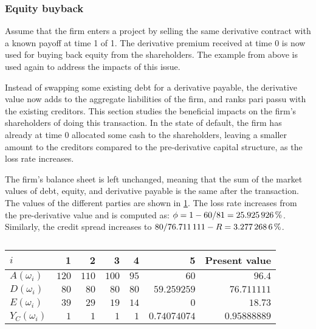 \documentclass[main.tex]{subfiles}
\begin{document}
        \subsubsection{Equity buyback}
            Assume that the firm enters a project 
            by selling the same derivative contract with a known payoff at time 1 of 1. 
            The derivative premium received at time 0 is now used for buying back equity from the shareholders. 
            The example from above is used again to address the impacts of this issue.

            Instead of swapping some existing debt for a derivative payable, 
            the derivative value now adds to the aggregate liabilities of the firm, 
            and ranks pari passu with the existing creditors.
            This section studies the beneficial impacts on the firm's shareholders of doing this transaction.
            In the state of default, the firm has already at time 0 allocated some cash to the shareholders, 
            leaving a smaller amount to the creditors compared to the pre-derivative capital structure, 
            as the loss rate increases.

            The firm's balance sheet is left unchanged, meaning that the sum of the market values of debt, equity, 
            and derivative payable is the same after the transaction. 
            The values of the different parties are shown in \cref{tbl:example-equity-buyback}. 
            The loss rate increases from the pre-derivative value and is computed as:
            $\phi = 1 - \num{60}/\num{81} = \pct{0.25925926}$.
            Similarly, the credit spread increases to
            $\num{80}/\num{76.711111} - \grossrfrate = \pct{0.032772686}$.
            \begin{table}[H]
                \centering
                \begin{tabular}{l|rrrrr||r}
                    $i$ & 1 & 2 & 3 & 4 & 5 & Present value \\
                    \hline
                    $A(\omega_{i})$ & $\num{120}$ & $\num{110}$ & $\num{100}$ & $\num{95}$ & $\num{60}$ & $\num{96.4}$ \\
                    $D(\omega_{i})$ & $\num{80}$ & $\num{80}$ & $\num{80}$ & $\num{80}$ & $\num{59.259259}$ & $\num{76.711111}$ \\
                    $E(\omega_{i})$ & $\num{39}$ & $\num{29}$ & $\num{19}$ & $\num{14}$ & $\num{0}$ & $\num{18.73}$ \\
                    $Y_C(\omega_{i})$ & $\num{1}$ & $\num{1}$ & $\num{1}$ & $\num{1}$ & $\num{0.74074074}$ & $\num{0.95888889}$ \\
                \end{tabular}
                \caption{}
                \label{tbl:example-equity-buyback}
            \end{table}
\end{document}
